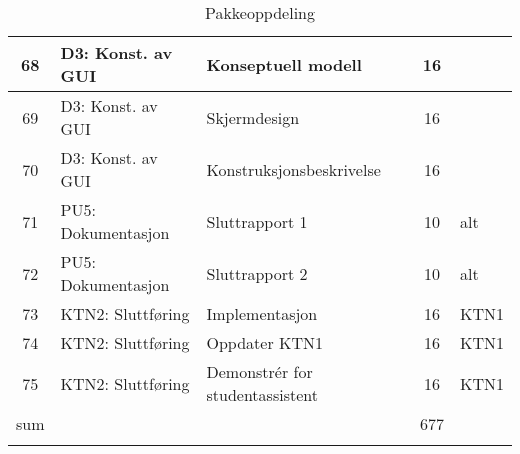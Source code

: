 \begin{longtable}[l]{|c|l|l|c|p{0.7cm}|}
	68 & D3: Konst. av GUI & Konseptuell modell & 16 & \\ \hline
	69 & D3: Konst. av GUI & Skjermdesign & 16 & \\ \hline
	70 & D3: Konst. av GUI & Konstruksjonsbeskrivelse & 16 & \\ \hline
	71 & PU5: Dokumentasjon & Sluttrapport  1& 10 & alt \\ \hline
	72 & PU5: Dokumentasjon & Sluttrapport  2& 10 & alt \\ \hline
	73 & KTN2: Sluttføring & Implementasjon & 16 & KTN1\\ \hline
	74 & KTN2: Sluttføring & Oppdater KTN1 & 16 & KTN1\\ \hline
	75 & KTN2: Sluttføring & Demonstrér for studentassistent & 16 & KTN1 \\ \hline
	sum & & & 677 & \\ \hline \hline

	\caption{Pakkeoppdeling}\\
	\end{longtable}